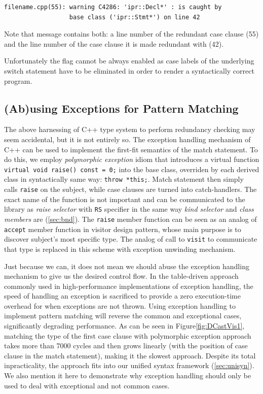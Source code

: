 \documentclass[preprint]{sigplanconf}
\makeatletter
\DeclareRobustCommand{\code}[1]{{\lstinline[breaklines=false,escapechar=@]{#1}}}
\makeatother
\begin{document}
\begin{lstlisting}
filename.cpp(55): warning C4286: 'ipr::Decl*' : is caught by 
                  base class ('ipr::Stmt*') on line 42
\end{lstlisting}

\noindent
Note that message contains both: a line number of the redundant case clause (55) 
and the line number of the case clause it is made redundant with (42).

Unfortunately the flag cannot be always enabled as case labels of the underlying 
switch statement have to be eliminated in order to render a syntactically 
correct program.

\subsection{(Ab)using Exceptions for Pattern Matching}
\label{sec:xpm}

The above harnessing of C++ type system to perform redundancy checking may seem 
accidental, but it is not entirely so. The exception handling mechanism of C++ 
can be used to implement the first-fit semantics of the match statement. To do 
this, we employ \emph{polymorphic exception} idiom\cite{PolyExcept} that 
introduces a virtual function \code{virtual void raise() const = 0;} into the 
base class, overriden by each derived class in syntactically same way: 
\code{throw *this;}. Match statement then simply calls 
\code{raise} on the subject, while case clauses are turned into catch-handlers. 
The exact name of the function is not important and can be communicated to the 
library as \emph{raise selector} with \code{RS} specifier in the same way 
\emph{kind selector} and \emph{class members} are (\textsection\ref{sec:bnd}). 
The \code{raise} member function can be seen as an analog of \code{accept} 
member function in visitor design pattern, whose main purpose is to discover 
subject's most specific type. The analog of call to \code{visit} to communicate 
that type is replaced in this scheme with exception unwinding mechanism.

Just because we can, it does not mean we should abuse the exception handling 
mechanism to give us the desired control flow. In the table-driven approach 
commonly used in high-performance implementations of exception handling, the 
speed of handling an exception is sacrificed to provide a zero execution-time 
overhead for when exceptions are not thrown\cite{Schilling98}. Using exception 
handling to implement pattern matching will reverse the common and exceptional 
cases, significantly degrading performance. As can be seen in 
Figure\ref{fig:DCastVis1}, matching the type of the first case clause with 
polymorphic exception approach takes more than 7000 cycles and then grows 
linearly (with the position of case clause in the match statement), making it the 
slowest approach. Despite its total inpracticality, the approach fits into our 
unified syntax framework (\textsection\ref{sec:unisyn}). We also mention it here 
to demonstrate why exception handling should only be used to deal with 
exceptional and not common cases.
\end{document}
